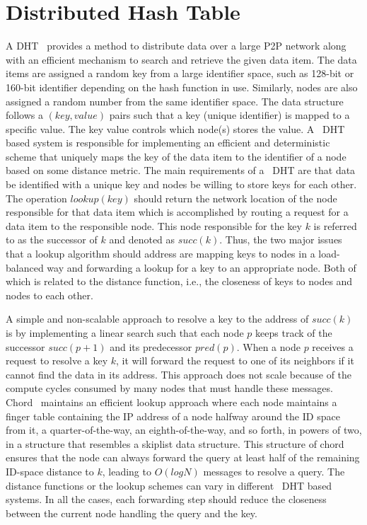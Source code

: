 \section{Distributed Hash Table} \label{DHT}
A \ac{DHT}~\cite{balakrishnan2003looking,tanenbaum2007distributed} provides a
method to distribute data over a large P2P network along with an efficient
mechanism to search and retrieve the given data item. The data items are
assigned a random key from a large identifier space, such as 128-bit or 160-bit
identifier depending on the hash function in use. Similarly, nodes are also
assigned a random number from the same identifier space. The data structure
follows a $(key, value)$ pairs such that a key (unique identifier) is mapped to
a specific value. The key value controls which node(s) stores the value. A
~\ac{DHT} based system is responsible for implementing an efficient and
deterministic scheme that uniquely maps the key of the data item to the
identifier of a node based on some distance metric. The main requirements of a
~\ac{DHT} are that data be identified with a unique key and nodes be willing to
store keys for each other. The operation $lookup(key)$ should return the
network location of the node responsible for that data item which is
accomplished by routing a request for a data item to the responsible node. This
node responsible for the key $k$ is referred to as the successor of $k$ and
denoted as $succ(k)$. Thus, the two major issues that a lookup algorithm should
address are mapping keys to nodes in a load-balanced way and forwarding a
lookup for a key to an appropriate node. Both of which is related to the
distance function, i.e., the closeness of keys to nodes and nodes to each
other.\par
A simple and non-scalable approach to resolve a key to the address of $succ(k)$
is by implementing a linear search such that each node $p$ keeps track of the
successor $succ(p+1)$ and its predecessor $pred(p)$. When a node $p$ receives a
request to resolve a key $k$, it will forward the request to one of its
neighbors if it cannot find the data in its address. This approach does not
scale because of the compute cycles consumed by many nodes that must handle
these messages. Chord~\cite{stoica2001chord,} maintains an efficient lookup
approach where each node maintains a finger table containing the IP address of
a node halfway around the ID space from it, a quarter-of-the-way, an
eighth-of-the-way, and so forth, in powers of two, in a structure that
resembles a skiplist data structure. This structure of chord ensures that the
node can always forward the query at least half of the remaining ID-space
distance to $k$, leading to $O(log N)$ messages to resolve a query. The
distance functions or the lookup schemes can vary in different ~\ac{DHT} based
systems.  In all the cases, each forwarding step should reduce the closeness
between the current node handling the query and the key.

